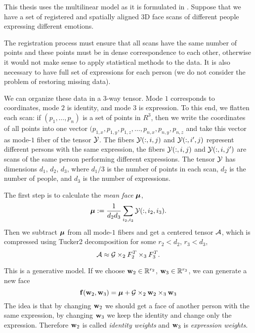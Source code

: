 This thesis uses the multilinear model as it is formulated in \cite{bolkart_wuhrer_2013}.
Suppose that we have a set of registered and spatially aligned 3D face scans of different people expressing different emotions.

The registration process must ensure that all scans have the same number of points
and these points must be in dense correspondence to each other, otherwise
it would not make sense to apply statistical methods
to the data. It is also necessary to have full set of expressions for each 
person (we do not consider the problem of restoring missing data).



We can organize these data in a $3$-way tensor. Mode $1$ corresponds
to coordinates, mode $2$ is identity, and mode $3$ is expression.
To this end, we flatten each scan: if $(p_1, \dots, p_n)$ is a set of points in $R^3$, then we write
the coordinates of all points into one vector $(p_{1, x}, p_{1, y}, p_{1, z}, \dots, p_{n, x}, p_{n, y}, p_{n, z}$
and take this vector as mode-$1$ fiber of the tensor $\mathcal{Y}$. The fibers $\mathcal{Y}(:, i, j)$
and $\mathcal{Y}(:, i', j)$ represent different persons with the same expression, the fibers
$\mathcal{Y}(:, i, j)$ and $\mathcal{Y}(:, i, j')$ are scans of the same person performing different expressions. 
The tensor $\mathcal{Y}$ has dimensions $d_1$, $d_2$, $d_3$, where $d_1 / 3$ is the number
of points in each scan, $d_2$ is the number of people, and $d_3$ is the number
of expressions.



The first step is to calculate the \textit{mean face} ${\boldsymbol{\mu}}$,
\begin{equation}
    {\boldsymbol{\mu}} := \frac{1}{d_2 d_3} \sum_{i_2, i_3} \mathcal{Y}(:, i_2, i_3).
\end{equation}
Then we subtract ${\boldsymbol{\mu}}$ from all mode-$1$ fibers and get a centered tensor $\mathcal{A}$, 
which is compressed using Tucker2 decomposition for some $r_2 < d_2$, $r_3 < d_3$,
\begin{equation}
    \mathcal{A} \approx \mathcal{G} \times_2 F_2^T \times_3 F_3^T.
\end{equation}



This is a generative model. If we choose $\mathbf{w}_2 \in \mathbb{R}^{r_2}$,
${\mathbf{w}}_3 \in \mathbb{R}^{r_3}$, we can generate a new face
\begin{equation}
    \label{mlm_generate}
    {\mathbf{f}}({\mathbf{w}}_2, {\mathbf{w}}_3) = {\boldsymbol{\mu}} +  \mathcal{G} \times_2 {\mathbf{w}}_2 \times_3 {\mathbf{w}}_3
\end{equation}
The idea is that by changing ${\mathbf{w}}_2$ we should get a face of another person
with the same expression, by changing ${\mathbf{w}}_3$ we keep the identity
and change only the expression. Therefore ${\mathbf{w}}_2$ is called \textit{identity weights}
and ${\mathbf{w}}_3$ is \textit{expression weights}.


